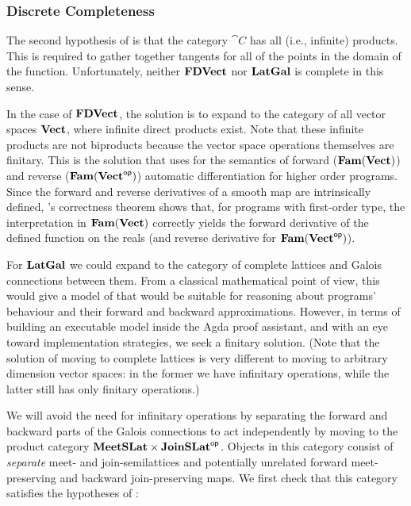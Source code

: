 \subsubsection{Discrete Completeness}
\label{sec:fixing-completeness}

The second hypothesis of  is that the category
$\cat{C}$ has all (i.e., infinite) products. This is required to
gather together tangents for all of the points in the domain of the
function. Unfortunately, neither $\mathbf{FDVect}$ nor $\mathbf{LatGal}$ is complete
in this sense.

In the case of $\mathbf{FDVect}$, the solution is to expand to the category
of all vector spaces $\mathbf{Vect}$, where infinite direct products
exist. Note that these infinite products are not biproducts because
the vector space operations themselves are finitary. This is the
solution that \cite{vakar2021} uses for the semantics of forward
($\mathbf{Fam}(\mathbf{Vect})$) and reverse ($\mathbf{Fam}(\mathbf{Vect}^{\mathsf{op}})$) automatic
differentiation for higher order programs. Since the forward and
reverse derivatives of a smooth map are intrinsically defined,
\citet{vakar2021}'s correctness theorem shows that, for programs with
first-order type, the interpretation in $\mathbf{Fam}(\mathbf{Vect})$ correctly yields
the forward derivative of the defined function on the reals (and
reverse derivative for $\mathbf{Fam}(\mathbf{Vect}^{\mathsf{op}})$).

For $\mathbf{LatGal}$ we could expand to the category of complete lattices and
Galois connections between them. From a classical mathematical point
of view, this would give a model of \GPS that would be suitable for
reasoning about programs' behaviour and their forward and backward
approximations. However, in terms of building an executable model
inside the Agda proof assistant, and with an eye toward implementation
strategies, we seek a finitary solution. (Note that the solution of
moving to complete lattices is very different to moving to arbitrary
dimension vector spaces: in the former we have infinitary operations,
while the latter still has only finitary operations.)

We will avoid the need for infinitary operations by separating the
forward and backward parts of the Galois connections to act
independently by moving to the product category
$\mathbf{MeetSLat} \times \mathbf{JoinSLat}^{\mathsf{op}}$. Objects in this category consist of
\emph{separate} meet- and join-semilattices and potentially unrelated
forward meet-preserving and backward join-preserving maps. We first
check that this category satisfies the hypotheses of
:

